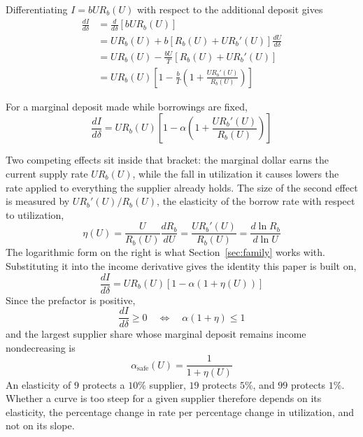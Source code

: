 \documentclass[11pt,a4paper]{article}
\begin{document}
Differentiating $I=bUR_b(U)$ with respect to the additional deposit gives
\begin{equation}
\begin{aligned}
\frac{dI}{d\delta}
&=\frac{d}{d\delta}\left[bUR_b(U)\right] \\
&=UR_b(U)+b\left[R_b(U)+UR_b'(U)\right]\frac{dU}{d\delta} \\
&=UR_b(U)-\frac{bU}{T}\left[R_b(U)+UR_b'(U)\right] \\
&=UR_b(U)\left[1-\frac{b}{T}\left(1+\frac{UR_b'(U)}{R_b(U)}\right)\right]
\end{aligned}
\end{equation}

\begin{proposition}
For a marginal deposit made while borrowings are fixed,
\begin{equation}
\boxed{
\frac{dI}{d\delta}
=UR_b(U)\left[1-\alpha\left(1+\frac{UR_b'(U)}{R_b(U)}\right)\right]
}
\end{equation}
\end{proposition}

Two competing effects sit inside that bracket: the marginal dollar earns the current supply rate $UR_b(U)$, while the fall in utilization it causes lowers the rate applied to everything the supplier already holds. The size of the second effect is measured by $UR_b'(U)/R_b(U)$, the elasticity of the borrow rate with respect to utilization,
\begin{equation}
\boxed{
\eta(U)=\frac{U}{R_b(U)}\frac{dR_b}{dU}
=\frac{UR_b'(U)}{R_b(U)}
=\frac{d\ln R_b}{d\ln U}
}
\label{eq:elasticity}
\end{equation}
The logarithmic form on the right is what Section~\ref{sec:family} works with. Substituting it into the income derivative gives the identity this paper is built on,
\begin{equation}
\boxed{
\frac{dI}{d\delta}
=UR_b(U)\left[1-\alpha(1+\eta(U))\right]
}
\label{eq:marginal}
\end{equation}
Since the prefactor is positive,
\begin{equation}
\frac{dI}{d\delta}\geq0
\quad\Longleftrightarrow\quad
\alpha(1+\eta)\leq1
\end{equation}
and the largest supplier share whose marginal deposit remains income nondecreasing is
\begin{equation}
\boxed{
\alpha_{\mathrm{safe}}(U)=\frac{1}{1+\eta(U)}
}
\end{equation}
An elasticity of $9$ protects a $10\%$ supplier, $19$ protects $5\%$, and $99$ protects $1\%$. Whether a curve is too steep for a given supplier therefore depends on its elasticity, the percentage change in rate per percentage change in utilization, and not on its slope.
\end{document}
